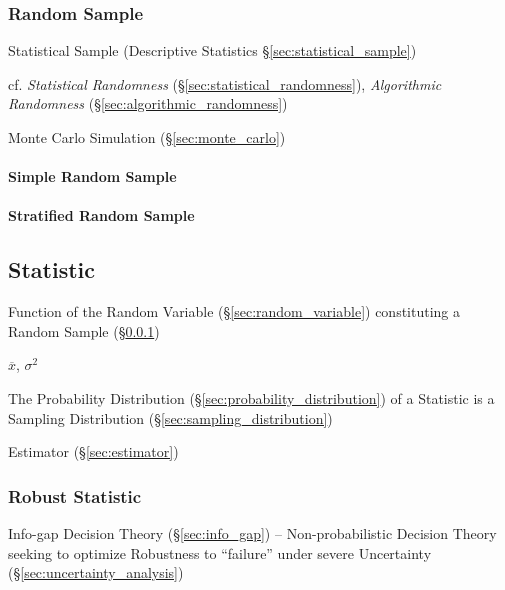 \subsubsection{Random Sample}\label{sec:random_sample}

Statistical Sample (Descriptive Statistics \S\ref{sec:statistical_sample})

cf. \emph{Statistical Randomness} (\S\ref{sec:statistical_randomness}),
\emph{Algorithmic Randomness} (\S\ref{sec:algorithmic_randomness})

\fist Monte Carlo Simulation (\S\ref{sec:monte_carlo})



\paragraph{Simple Random Sample}\label{sec:simple_random_sample}\hfill

\paragraph{Stratified Random Sample}\label{sec:stratified_random_sample}\hfill



\subsection{Statistic}\label{sec:statistic}

Function of the Random Variable (\S\ref{sec:random_variable}) constituting a
Random Sample (\S\ref{sec:random_sample})

$\overline{x}$, $\sigma^2$

The Probability Distribution (\S\ref{sec:probability_distribution}) of
a Statistic is a Sampling Distribution
(\S\ref{sec:sampling_distribution})

Estimator (\S\ref{sec:estimator})



\subsubsection{Robust Statistic}\label{sec:robust_statistic}

\fist Info-gap Decision Theory (\S\ref{sec:info_gap}) -- Non-probabilistic
Decision Theory seeking to optimize Robustness to ``failure'' under severe
Uncertainty (\S\ref{sec:uncertainty_analysis})



